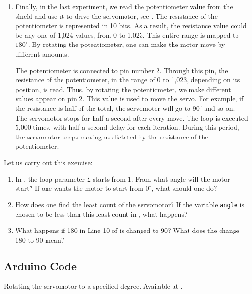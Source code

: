 \begin{enumerate}
\item Finally, in the last experiment, we read the potentiometer value
  from the shield and use it to drive the servomotor, see
  .  The resistance of the potentiometer is
  represented in 10 bits.  As a result, the resistance value could be
  any one of 1,024 values, from 0 to 1,023.  This entire range is
  mapped to $180^\circ$.  By rotating the potentiometer, one can make
  the motor move by different amounts.

  The potentiometer is connected to pin number 2.  Through this pin,
  the resistance of the potentiometer, in the range of 0 to 1,023,
  depending on its position, is read.  Thus, by rotating the
  potentiometer, we make different values appear on pin 2.  This value
  is used to move the servo.  For example, if the resistance is half
  of the total, the servomotor will go to $90^\circ$ and so on.  The
  servomotor stops for half a second after every move.  The loop is
  executed 5,000 times, with half a second delay for each iteration.
  During this period, the servomotor keeps moving as dictated by the
  resistance of the potentiometer.

\end{enumerate}

\begin{exercise}
Let us carry out this exercise:
\begin{enumerate}
\item In , the loop parameter {\tt i} starts
  from 1.  From what angle will the motor start?  If one wants the
  motor to start from $0^\circ$, what should one do?
\item How does one find the least count of the servomotor?  If the
  variable {\tt angle} is chosen to be less than this least count in
  , what happens?
\item What happens if 180 in Line 10 of  is
  changed to 90?  What does the change 180 to 90 mean?
\end{enumerate}
\end{exercise}

\subsection{Arduino Code}
\lstset{style=mystyle}
\label{sec:servo-arduino-code}

\begin{ardcode}
   {Rotating
    the servomotor to a specified degree.  Available at
    .}
  \label{ard:servo-init}
  
\end{ardcode}

